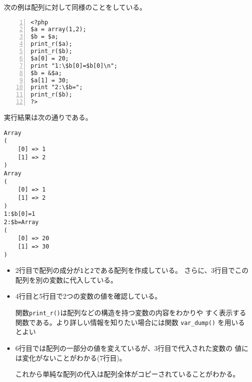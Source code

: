  \begin{Exec}\upshape
 次の例は配列に対して同様のことをしている。
\begin{Verbatim}[numbers=left]
<?php
$a = array(1,2);
$b = $a;
print_r($a);
print_r($b);
$a[0] = 20;
print "1:\$b[0]=$b[0]\n";
$b = &$a;
$a[1] = 30;
print "2:\$b=";
print_r($b);
?>
\end{Verbatim}
実行結果は次の通りである。
\begin{Verbatim}
Array
(
    [0] => 1
    [1] => 2
)
Array
(
    [0] => 1
    [1] => 2
)
1:$b[0]=1
2:$b=Array
(
    [0] => 20
    [1] => 30
)

\end{Verbatim}
\begin{itemize}
 \item 2行目で配列の成分が\texttt{1}と\texttt{2}である配列を作成している。
       さらに、3行目でこの配列を別の変数に代入している。
 \item 4行目と5行目で2つの変数の値を確認している。
       
      関数\texttt{print\_r()}は配列などの構造を持つ変数の内容をわかりや
 すく表示する関数である。より詳しい情報を知りたい場合には関数
       \texttt{var\_dump()} を用いるとよい
 \item 6行目では配列の一部分の値を変えているが、3行目で代入された変数の
       値には変化がないことがわかる(7行目)。

       これから単純な配列の代入は配列全体がコピーされていることがわかる。
\end{itemize}
\end{Exec}

 \fi
 \iffalse%
 \subsection{可変変数}
 ある変数の値が文字列のとき、その前に\Verb+$+をつけると、その文字列が変
 数名として使える。
 \begin{Exec}\upshape
  次のリストは可変変数の使用例である。
\begin{Verbatim}[numbers=left]
<?php
$a = 1;
$b = 2;

$c = "a";
print "\$\$c = " . $$c ."\n";  // $$c = 1

$c = "b";
print "\$\$c = " . $$c . "\n"; // $$c = 2
?>
\end{Verbatim}
  \begin{itemize}\upshape
   \item 変数\Verb+$a+ と \Verb+$b+ にそれぞれ$1$と$2$を代入している(1行
         目と2行目)。
   \item 変数\Verb+$c+に文字列\Verb+"a"+を代入し、\Verb+$$c+を出力させ
         ると\Verb+$a+の値が表示される(5行目と6行目)。
   \item 同様に、変数\Verb+$c+に文字列\Verb+"b"+を代入して、\Verb+$$c+を出力させ
         ると\Verb+$b+の値が表示される(8行目と9行目)。
  \end{itemize}
 \end{Exec}
 \fi

